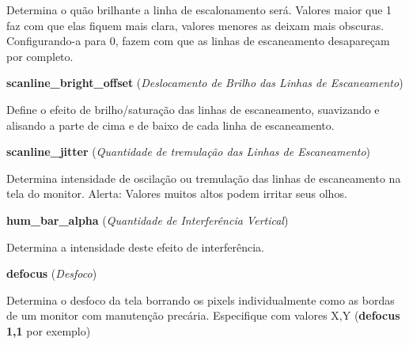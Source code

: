 \documentclass[letterpaper,10pt,brazil]{sphinxmanual}
\begin{document}
\begin{DUlineblock}{0em}
\item[] 
\item[]
\begin{DUlineblock}{\DUlineblockindent}
\item[] Determina o quão brilhante a linha de escalonamento será. Valores maior que 1 faz com que elas fiquem mais clara, valores menores as deixam mais obscuras. Configurando-a para 0, fazem com que as linhas de escaneamento desapareçam por completo.
\item[] 
\end{DUlineblock}
\item[] \textbf{scanline\_bright\_offset} (\emph{Deslocamento de Brilho das Linhas de Escaneamento})
\item[] 
\item[]
\begin{DUlineblock}{\DUlineblockindent}
\item[] Define o efeito de brilho/saturação das linhas de escaneamento, suavizando e alisando a parte de cima e de baixo de cada linha de escaneamento.
\item[] 
\end{DUlineblock}
\item[] \textbf{scanline\_jitter} (\emph{Quantidade de tremulação das Linhas de Escaneamento})
\item[] 
\item[]
\begin{DUlineblock}{\DUlineblockindent}
\item[] Determina intensidade de oscilação ou tremulação das linhas de escaneamento na tela do monitor. Alerta: Valores muitos altos podem irritar seus olhos.
\item[] 
\end{DUlineblock}
\item[] \textbf{hum\_bar\_alpha} (\emph{Quantidade de Interferência Vertical})
\item[] 
\item[]
\begin{DUlineblock}{\DUlineblockindent}
\item[] Determina a intensidade deste efeito de interferência.
\item[] 
\end{DUlineblock}
\item[] \textbf{defocus} (\emph{Desfoco})
\item[] 
\item[]
\begin{DUlineblock}{\DUlineblockindent}
\item[] Determina o desfoco da tela borrando os pixels individualmente como as bordas de um monitor com manutenção precária. Especifique com valores X,Y (\textbf{defocus 1,1} por exemplo)

\end{DUlineblock}
\end{DUlineblock}
\end{document}

